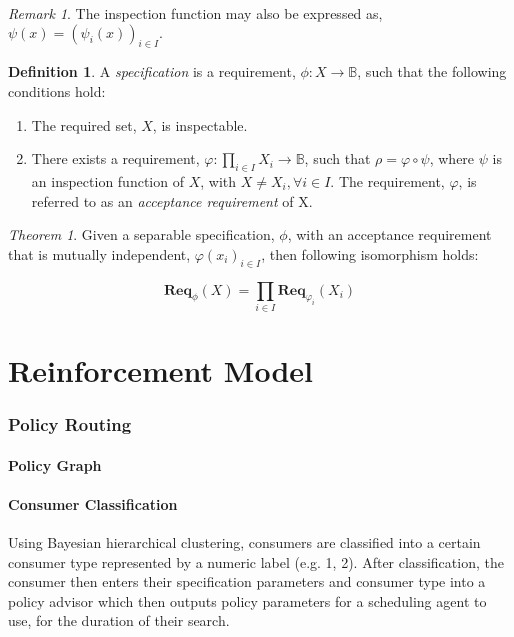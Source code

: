 \documentclass{article}
\theoremstyle{definition}
\newtheorem{definition}{Definition}[section]
\theoremstyle{remark}
\newtheorem*{remark}{Remark}
\newtheorem*{theorem}{Theorem}
\newcommand{\reqfunc}[2]{#1:#2\rightarrow\mathbb{B}}
\newcommand{\reqop}[2]{\mathbf{Req}_{#1}(#2)}
\begin{document}
		\begin{remark}
			The inspection function may also be expressed as, $\psi(x) = (\psi_{i}(x))_{i \in I}.$
		\end{remark}
		
		\begin{definition}
			A \emph{specification} is a requirement, $\reqfunc{\phi}{X}$, such that the following conditions
			hold:
			
			\begin{enumerate}
				\item   The required set, $X$, is inspectable.
				
				\item   There exists a requirement, $\reqfunc{\varphi}{\prod_{i \in I}{X_{i}}}$,
				such that $\rho = \varphi \circ \psi$, where $\psi$ is an inspection function of $X$,
				with $X \ne X_{i}, \forall i \in I$. The requirement, $\varphi$, is referred to as an
				\emph{acceptance requirement} of X.
			\end{enumerate}
			
		\end{definition}
		
		\begin{theorem}
			Given a separable specification, $\phi$, with an acceptance requirement that is mutually independent,
			$\varphi(x_i)_{i \in I}$, then following isomorphism holds:
			
			\[
			\reqop{\phi}{X} = \prod_{i \in I}\reqop{\varphi_{i}}{X_{i}}
			\]
		\end{theorem}
	

	
	\newpage
	
	\part{Reinforcement Model}
	
	\section{Policy Routing}
	
	\subsection{Policy Graph}
	

	\subsection{Consumer Classification}
	Using Bayesian hierarchical clustering, consumers are classified into a certain consumer type represented by a
    numeric label (e.g. 1, 2). After classification, the consumer then enters their specification parameters and
    consumer type into a policy advisor which then outputs policy parameters for a scheduling agent to use, for
    the duration of their search.
\end{document}
